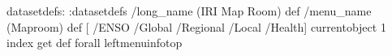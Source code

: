 \begin{ingrid}
datasetdefs:
:datasetdefs
/long_name (IRI Map Room) def
/menu_name (Maproom) def
[ /ENSO /Global /Regional /Local /Health]
{ currentobject 1 index get  def} forall
leftmenuinfotop
\end{ingrid}
